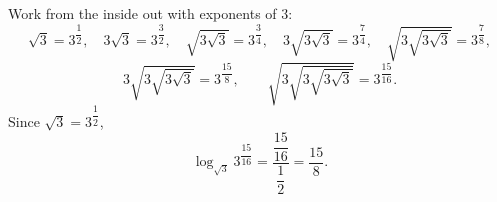 Work from the inside out with exponents of $3$:
\[\sqrt3=3^{\dfrac12},\quad3\sqrt3=3^{\dfrac32},\quad\sqrt{3\sqrt3}=3^{\dfrac34},\quad3\sqrt{3\sqrt3}=3^{\dfrac74},\quad\sqrt{3\sqrt{3\sqrt3}}=3^{\dfrac78},\]
\[3\sqrt{3\sqrt{3\sqrt3}}=3^{\dfrac{15}8},\qquad\sqrt{3\sqrt{3\sqrt{3\sqrt3}}}=3^{\dfrac{15}{16}}.\]
Since $\sqrt3=3^{\dfrac12}$,
\[\log_{\sqrt3}3^{\dfrac{15}{16}}=\dfrac{\dfrac{15}{16}}{\dfrac12}=\boxed{\dfrac{15}{8}}.\]
